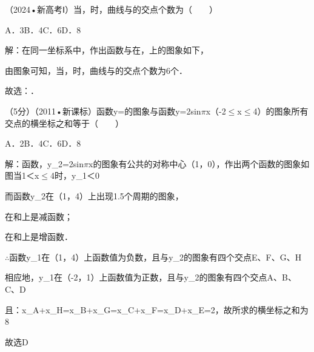 \begin{question}
（2024•新高考Ⅰ）当\FormulaOCR{image1417.wmf}{x\in [0}，\FormulaOCR{image1418.wmf}{2\pi ]}时，曲线与的交点个数为（　　）\par
\qquad{}\qquad{}\qquad{}A．3\qquad{}B．4\qquad{}C．6\qquad{}D．8\par
\begin{solution}
解：在同一坐标系中，作出函数与在\FormulaOCR{image1423.wmf}{[0}，\FormulaOCR{image1424.wmf}{2\pi ]}上的图象如下，\par
{}\par
由图象可知，当\FormulaOCR{image1426.wmf}{x\in [0}，\FormulaOCR{image1427.wmf}{2\pi ]}时，曲线与的交点个数为6个．\par
故选：．\par
\end{solution}
\end{question}

\begin{question}
（5分）（2011•新课标）函数y=的图象与函数y=2sin\ensuremath{\pi}x（-2\ensuremath{\le}x\ensuremath{\le}4）的图象所有交点的横坐标之和等于（　　）\par
A．2\qquad{}B．4\qquad{}C．6\qquad{}D．8\par
\begin{solution}
解：函数，y\_{2}=2sin\ensuremath{\pi}x的图象有公共的对称中心（1，0），作出两个函数的图象如图当1＜x\ensuremath{\le}4时，y\_{1}＜0\par
而函数y\_{2}在（1，4）上出现1.5个周期的图象，\par
在和上是减函数；\par
在和上是增函数．\par
\ensuremath{\therefore}函数y\_{1}在（1，4）上函数值为负数，且与y\_{2}的图象有四个交点E、F、G、H\par
相应地，y\_{1}在（-2，1）上函数值为正数，且与y\_{2}的图象有四个交点A、B、C、D\par
且：x\_{A}+x\_{H}=x\_{B}+x\_{G}=x\_{C}+x\_{F}=x\_{D}+x\_{E}=2，故所求的横坐标之和为8\par
故选D\par
{}\par
\end{solution}
\end{question}

